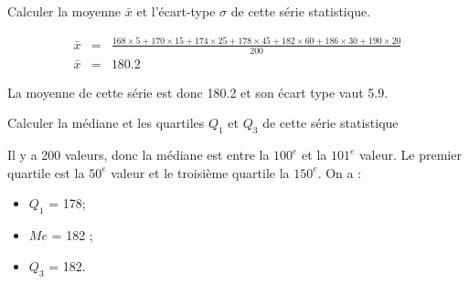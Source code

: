 \begin{questions}
	\question[1] Calculer la moyenne $\bar{x}$ et l'écart-type $\sigma$ de cette série statistique.
	\begin{solution}
		\begin{eqnarray*}
			\bar{x} &=& \frac{168 \times 5 + 170 \times 15 + 174 \times 25 + 178 \times 45 + 182 \times 60 + 186 \times 30 + 190 \times 20}{200}\\
			\bar{x}&=& \num{180.2}
		\end{eqnarray*}
	
		La moyenne de cette série est donc \num{180.2} et son écart type vaut \num{5.9}.
	\end{solution}
	
	\question[1] Calculer la médiane et les quartiles $Q_1$ et $Q_3$ de cette série statistique
	
	\begin{solution}
		Il y a 200 valeurs, donc la médiane est entre la $100^e$ et la $101^e$ valeur. Le premier quartile est la $50^e$ valeur et le troisième quartile la $150^e$. On a :
		
		\begin{itemize}
			\item $Q_1$ = 178;
			\item $Me$ = 182 ;
			\item $Q_3$ = 182.
		\end{itemize}
	\end{solution}
	
	\question[2] 
	
\end{questions}
